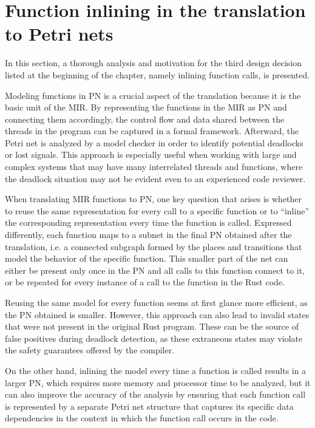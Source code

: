 \section{Function inlining in the translation to Petri nets}

In this section, a thorough analysis and motivation for the third design decision
listed at the beginning of the chapter, namely inlining function calls, is presented.

Modeling functions in \acrshort{PN} is a crucial aspect of the translation
because it is the basic unit of the MIR.
By representing the functions in the MIR as \acrshort{PN} and connecting them accordingly,
the control flow and data shared between the threads in the program
can be captured in a formal framework.
Afterward, the Petri net is analyzed by a model checker
in order to identify potential deadlocks or lost signals.
This approach is especially useful when working with large and complex systems
that may have many interrelated threads and functions,
where the deadlock situation may not be evident even to an experienced code reviewer.

When translating MIR functions to \acrshort{PN}, one key question that arises is
whether to reuse the same representation for every call to a specific function or
to ``inline'' the corresponding representation every time the function is called.
Expressed differently, each function maps to a subnet
in the final \acrshort{PN} obtained after the translation, i.e.
a connected subgraph formed by the places and transitions
that model the behavior of the specific function.
This smaller part of the net can either be present only once in the \acrshort{PN}
and all calls to this function connect to it,
or be repeated for every instance of a call to the function in the Rust code.

Reusing the same model for every function seems at first glance more efficient,
as the \acrshort{PN} obtained is smaller.
However, this approach can also lead to invalid states
that were not present in the original Rust program.
These can be the source of false positives during deadlock detection,
as these extraneous states may violate
the safety guarantees offered by the compiler.

On the other hand, inlining the model every time a function is called results in
a larger \acrshort{PN}, which requires more memory and processor time to be analyzed,
but it can also improve the accuracy of the analysis by ensuring
that each function call is represented by a separate Petri net structure
that captures its specific data dependencies in the context
in which the function call occurs in the code.

